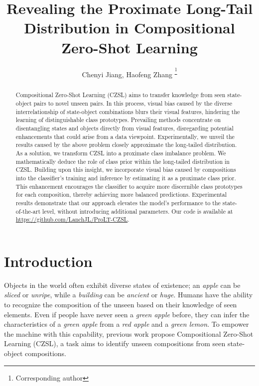 \documentclass[letterpaper]{article} %
\title{Revealing the Proximate Long-Tail Distribution in Compositional Zero-Shot Learning }
\author {
     Chenyi Jiang\textsuperscript{},
    Haofeng Zhang\textsuperscript{ \thanks{Corresponding author}}
}
\theoremstyle{definition}
\begin{document}
\maketitle


\begin{abstract}
Compositional Zero-Shot Learning (CZSL) aims to transfer knowledge from seen state-object pairs to novel unseen pairs. In this process, visual bias caused by the diverse interrelationship of state-object combinations blurs their visual features, hindering the learning of distinguishable class prototypes. Prevailing methods concentrate on disentangling states and objects directly from visual features, disregarding potential enhancements that could arise from a data viewpoint. Experimentally, we unveil the results caused by the above problem closely approximate the long-tailed distribution. As a solution, we transform CZSL into a proximate class imbalance problem. We mathematically deduce the role of class prior within the long-tailed distribution in CZSL. Building upon this insight, we incorporate visual bias caused by compositions into the classifier's training and inference by estimating it as a proximate class prior. This enhancement encourages the classifier to acquire more discernible class prototypes for each composition, thereby achieving more balanced predictions. Experimental results demonstrate that our approach elevates the model's performance to the state-of-the-art level, without introducing additional parameters. Our code is available at \url{https://github.com/LanchJL/ProLT-CZSL}.
\end{abstract}
\section{Introduction}
\label{sec:intro}
Objects in the world often exhibit diverse states of existence; an \textit{apple} can be \textit{sliced} or \textit{unripe}, while a \textit{building} can be \textit{ancient} or \textit{huge}. Humans have the ability to recognize the composition of the unseen based on their knowledge of seen elements. Even if people have never seen a \textit{green apple} before, they can infer the characteristics of a \textit{green apple} from a \textit{red apple} and a \textit{green lemon}. To empower the machine with this capability, previous work \cite{misra2017red,purushwalkam2019task} propose Compositional Zero-Shot Learning (CZSL), a task aims to identify unseen compositions from seen state-object compositions.
\end{document}

